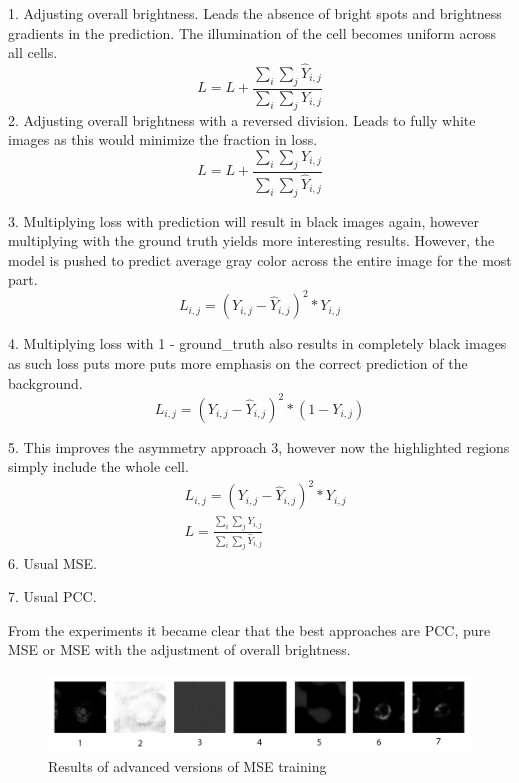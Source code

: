 1. Adjusting overall brightness. Leads the absence of bright spots and brightness gradients in the prediction. The illumination of the cell becomes uniform across all cells.
\begin{equation}
	L = L + \frac{\sum\limits_i\sum\limits_j \hat{Y}_{i, j}}{\sum\limits_i\sum\limits_j Y_{i, j}}
\end{equation}
2. Adjusting overall brightness with a reversed division. Leads to fully white images as this would minimize the fraction in loss.
\begin{equation}
	L = L + \frac{\sum\limits_i\sum\limits_j Y_{i, j}}{\sum\limits_i\sum\limits_j \hat{Y}_{i, j}}
\end{equation}

3. Multiplying loss with prediction will result in black images again, however multiplying with the ground truth yields more interesting results. However, the model is pushed to predict average gray color across the entire image for the most part.
\begin{equation}
	L_{i, j} = \left(Y_{i, j} - \hat{Y}_{i, j}\right)^2 * Y_{i, j}
\end{equation}

4. Multiplying loss with 1 - ground\_truth also results in completely black images as such loss puts more puts more emphasis on the correct prediction of the background.
\begin{equation}
	L_{i, j} = \left(Y_{i, j} - \hat{Y}_{i, j}\right)^2  * \left(1 - Y_{i, j}\right)
\end{equation}

5. This improves the asymmetry approach 3, however now the highlighted regions simply include the whole cell.
\begin{align}
	&L_{i, j} = \left(Y_{i, j} - \hat{Y}_{i, j}\right)^2 * Y_{i, j} \\
	&L = \frac{\sum\limits_i\sum\limits_j Y_{i, j}}{\sum\limits_i\sum\limits_j \hat{Y}_{i, j}}
\end{align}
6. Usual MSE.

7. Usual PCC.

From the experiments it became clear that the best approaches are PCC, pure MSE or MSE with the adjustment of overall brightness.

\begin{figure}[H]
	\begin{center}
		\includegraphics[width=\linewidth]{bilder/golgi/asymmetrical-predictions.png}
		\caption{Results of advanced versions of MSE training}\label{fig:golgi-asymmetrical-predictions}
	\end{center}
\end{figure} 